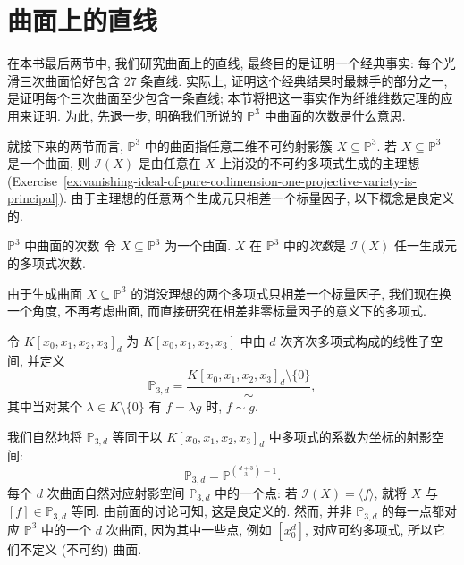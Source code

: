 \section{曲面上的直线}\label{sec:lines-on-surfaces}

在本书最后两节中, 我们研究曲面上的直线, 最终目的是证明一个经典事实: 每个光滑三次曲面恰好包含 $27$ 条直线. 实际上, 证明这个经典结果时最棘手的部分之一, 是证明每个三次曲面至少包含一条直线; 本节将把这一事实作为纤维维数定理的应用来证明. 为此, 先退一步, 明确我们所说的 $\mathbb{P}^{3}$ 中曲面的次数是什么意思.

就接下来的两节而言, $\mathbb{P}^{3}$ 中的曲面指任意二维不可约射影簇 $X\subseteq\mathbb{P}^{3}$. 若 $X\subseteq\mathbb{P}^{3}$ 是一个曲面, 则 $\mathcal{I}(X)$ 是由任意在 $X$ 上消没的不可约多项式生成的主理想 (Exercise~\ref{ex:vanishing-ideal-of-pure-codimension-one-projective-variety-is-principal}). 由于主理想的任意两个生成元只相差一个标量因子, 以下概念是良定义的.

\begin{Definition}{$\mathbb{P}^{3}$ 中曲面的次数}\leavevmode\label{def:degree-of-surface-in-projective-three-space}
令 $X\subseteq\mathbb{P}^{3}$ 为一个曲面. $X$ 在 $\mathbb{P}^{3}$ 中的\emph{次数}是 $\mathcal{I}(X)$ 任一生成元的多项式次数.
\end{Definition}


由于生成曲面 $X\subseteq\mathbb{P}^{3}$ 的消没理想的两个多项式只相差一个标量因子, 我们现在换一个角度, 不再考虑曲面, 而直接研究在相差非零标量因子的意义下的多项式.

\begin{BookNotation}\leavevmode\label{notation:projective-space-of-degree-d-polynomials}
令 $K[x_{0},x_{1},x_{2},x_{3}]_{d}$ 为 $K[x_{0},x_{1},x_{2},x_{3}]$ 中由 $d$ 次齐次多项式构成的线性子空间, 并定义
\[
  \mathbb{P}_{3,d}=\frac{K[x_{0},x_{1},x_{2},x_{3}]_{d}\setminus\{0\}}{\sim},
\]
其中当对某个 $\lambda\in K\setminus\{0\}$ 有 $f=\lambda g$ 时, $f\sim g$.
\end{BookNotation}

我们自然地将 $\mathbb{P}_{3,d}$ 等同于以 $K[x_{0},x_{1},x_{2},x_{3}]_{d}$ 中多项式的系数为坐标的射影空间:
\[
  \mathbb{P}_{3,d}=\mathbb{P}^{\binom{d+3}{3}-1}.
\]
每个 $d$ 次曲面自然对应射影空间 $\mathbb{P}_{3,d}$ 中的一个点: 若 $\mathcal{I}(X)=\langle f\rangle$, 就将 $X$ 与 $[f]\in\mathbb{P}_{3,d}$ 等同. 由前面的讨论可知, 这是良定义的. 然而, 并非 $\mathbb{P}_{3,d}$ 的每一点都对应 $\mathbb{P}^{3}$ 中的一个 $d$ 次曲面, 因为其中一些点, 例如 $[x_{0}^{d}]$, 对应可约多项式, 所以它们不定义 (不可约) 曲面.

